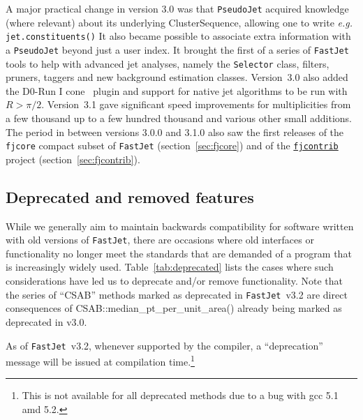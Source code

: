 \documentclass[12pt,a4]{article}
\newcommand{\fastjet}{\texttt{FastJet}\xspace}
\newcommand{\fjcontrib}{\texttt{\href{http://fastjet.hepforge.org/contrib/}{fjcontrib}}\xspace}
\newcommand{\fjcore}{\texttt{fjcore}\xspace}
\newcommand{\ttt}[1]{{\small\texttt{#1}}}
\begin{document}
A major practical change in version 3.0 was that \ttt{PseudoJet}
acquired knowledge 
(where relevant) about its underlying ClusterSequence, allowing one to
write {\em e.g.}  \ttt{jet.constituents()}
%
It also became possible to associate extra information with a
\ttt{PseudoJet} beyond just a user index.
%
It brought the first of a series of \fastjet tools to help with
advanced jet analyses, namely the \ttt{Selector} class, filters,
  pruners, taggers and new background estimation classes.
%
Version~3.0 also added the D0-Run I cone~\cite{Abbott:1997fc} plugin and
support for native jet algorithms to be run with $R>\pi/2$.
%
Version~3.1 gave significant speed improvements for multiplicities
from a few thousand up to a few hundred thousand and various other
small additions.
%
The period in between versions 3.0.0 and 3.1.0 also saw the first
releases of the \fjcore compact subset of \fastjet
(section~\ref{sec:fjcore}) and of the \fjcontrib project
(section~\ref{sec:fjcontrib}).

\subsection{Deprecated and removed features}
\label{sec:deprecated}

While we generally aim to maintain backwards compatibility for
software written with old versions of \fastjet, there are occasions
where old interfaces or functionality no longer meet the standards that
are demanded of a program that is increasingly widely used.
%
Table~\ref{tab:deprecated} lists the cases where such considerations
have led us to deprecate and/or remove functionality.
%
Note that the series of ``CSAB'' methods marked as deprecated in
\fastjet~v3.2 are direct consequences of
CSAB::median\_pt\_per\_unit\_area() already being marked as deprecated in
v3.0.

As of \fastjet~v3.2, whenever supported by the compiler, a
``deprecation'' message will be issued at compilation
time.\footnote{This is not available for all deprecated methods due
  to a bug with gcc 5.1 amd 5.2.}
\end{document}
